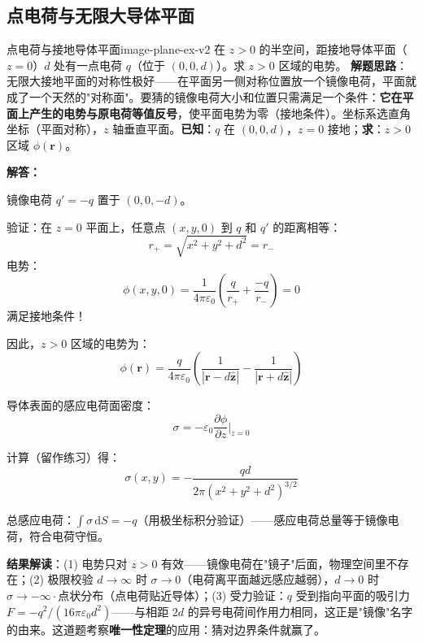 \documentclass[11pt,a4paper,openany,oneside]{book}
\newcommand{\diff}{\mathrm{d}}
\newcommand{\eps}{\varepsilon}
\newcommand{\vect}[1]{\bm{#1}}
\newcommand{\unitvec}[1]{\hat{\vect{#1}}}
\newcommand{\difficulty}[1]{\marginnote{\textcolor{red}{\textbf{[#1]}}}}
\begin{document}
\subsection{点电荷与无限大导体平面}

\begin{example}{点电荷与接地导体平面}{image-plane-ex-v2}
\difficulty{基础}
在 $z > 0$ 的半空间，距接地导体平面（$z=0$）$d$ 处有一点电荷 $q$（位于 $(0,0,d)$）。求 $z>0$ 区域的电势。
\tcblower
\textbf{解题思路}：无限大接地平面的对称性极好——在平面另一侧对称位置放一个镜像电荷，平面就成了一个天然的"对称面"。要猜的镜像电荷大小和位置只需满足一个条件：\textbf{它在平面上产生的电势与原电荷等值反号}，使平面电势为零（接地条件）。坐标系选直角坐标（平面对称），$z$ 轴垂直平面。\textbf{已知}：$q$ 在 $(0,0,d)$，$z=0$ 接地；\textbf{求}：$z>0$ 区域 $\phi(\vect{r})$。

\textbf{解答：}

镜像电荷 $q' = -q$ 置于 $(0,0,-d)$。

验证：在 $z=0$ 平面上，任意点 $(x,y,0)$ 到 $q$ 和 $q'$ 的距离相等：
\[
r_+ = \sqrt{x^2+y^2+d^2} = r_-
\]
电势：
\[
\phi(x,y,0) = \frac{1}{4\pi\eps_0}\left(\frac{q}{r_+} + \frac{-q}{r_-}\right) = 0
\]
满足接地条件！

因此，$z>0$ 区域的电势为：
\[
\phi(\vect{r}) = \frac{q}{4\pi\eps_0}\left(\frac{1}{|\vect{r} - d\unitvec{z}|} - \frac{1}{|\vect{r} + d\unitvec{z}|}\right)
\]

导体表面的感应电荷面密度：
\[
\sigma = -\eps_0 \frac{\partial\phi}{\partial z}\bigg|_{z=0}
\]

计算（留作练习）得：
\[
\sigma(x,y) = -\frac{qd}{2\pi(x^2+y^2+d^2)^{3/2}}
\]

总感应电荷：$\int\sigma\,\diff S = -q$（用极坐标积分验证）——感应电荷总量等于镜像电荷，符合电荷守恒。

\textbf{结果解读}：(1) 电势只对 $z>0$ 有效——镜像电荷在"镜子"后面，物理空间里不存在；(2) 极限校验 $d\to\infty$ 时 $\sigma\to 0$（电荷离平面越远感应越弱），$d\to 0$ 时 $\sigma \to -\infty\cdot$点状分布（点电荷贴近导体）；(3) 受力验证：$q$ 受到指向平面的吸引力 $F = -q^2/(16\pi\eps_0 d^2)$——与相距 $2d$ 的异号电荷间作用力相同，这正是"镜像"名字的由来。这道题考察\textbf{唯一性定理}的应用：猜对边界条件就赢了。
\end{example}
\end{document}
